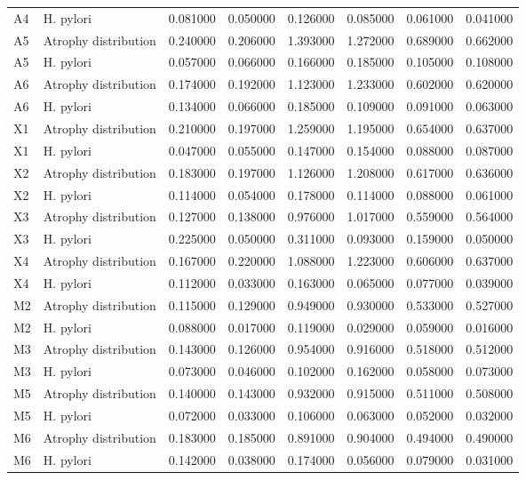 \begin{table}
\begin{tabular}{llrrrrrr}
A4 & H. pylori & 0.081000 & 0.050000 & 0.126000 & 0.085000 & 0.061000 & 0.041000 \\
A5 & Atrophy distribution & 0.240000 & 0.206000 & 1.393000 & 1.272000 & 0.689000 & 0.662000 \\
A5 & H. pylori & 0.057000 & 0.066000 & 0.166000 & 0.185000 & 0.105000 & 0.108000 \\
A6 & Atrophy distribution & 0.174000 & 0.192000 & 1.123000 & 1.233000 & 0.602000 & 0.620000 \\
A6 & H. pylori & 0.134000 & 0.066000 & 0.185000 & 0.109000 & 0.091000 & 0.063000 \\
X1 & Atrophy distribution & 0.210000 & 0.197000 & 1.259000 & 1.195000 & 0.654000 & 0.637000 \\
X1 & H. pylori & 0.047000 & 0.055000 & 0.147000 & 0.154000 & 0.088000 & 0.087000 \\
X2 & Atrophy distribution & 0.183000 & 0.197000 & 1.126000 & 1.208000 & 0.617000 & 0.636000 \\
X2 & H. pylori & 0.114000 & 0.054000 & 0.178000 & 0.114000 & 0.088000 & 0.061000 \\
X3 & Atrophy distribution & 0.127000 & 0.138000 & 0.976000 & 1.017000 & 0.559000 & 0.564000 \\
X3 & H. pylori & 0.225000 & 0.050000 & 0.311000 & 0.093000 & 0.159000 & 0.050000 \\
X4 & Atrophy distribution & 0.167000 & 0.220000 & 1.088000 & 1.223000 & 0.606000 & 0.637000 \\
X4 & H. pylori & 0.112000 & 0.033000 & 0.163000 & 0.065000 & 0.077000 & 0.039000 \\
M2 & Atrophy distribution & 0.115000 & 0.129000 & 0.949000 & 0.930000 & 0.533000 & 0.527000 \\
M2 & H. pylori & 0.088000 & 0.017000 & 0.119000 & 0.029000 & 0.059000 & 0.016000 \\
M3 & Atrophy distribution & 0.143000 & 0.126000 & 0.954000 & 0.916000 & 0.518000 & 0.512000 \\
M3 & H. pylori & 0.073000 & 0.046000 & 0.102000 & 0.162000 & 0.058000 & 0.073000 \\
M5 & Atrophy distribution & 0.140000 & 0.143000 & 0.932000 & 0.915000 & 0.511000 & 0.508000 \\
M5 & H. pylori & 0.072000 & 0.033000 & 0.106000 & 0.063000 & 0.052000 & 0.032000 \\
M6 & Atrophy distribution & 0.183000 & 0.185000 & 0.891000 & 0.904000 & 0.494000 & 0.490000 \\
M6 & H. pylori & 0.142000 & 0.038000 & 0.174000 & 0.056000 & 0.079000 & 0.031000 \\

\end{tabular}
\end{table}
